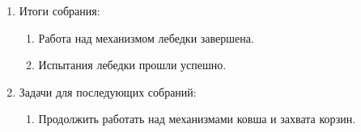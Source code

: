\begin{enumerate}
\begin{enumerate}
    \end{enumerate}
    
	\item Итоги собрания: 
	\begin{enumerate}
	  \item	Работа над механизмом лебедки завершена.
	  
	  \item	Испытания лебедки прошли успешно.
	  
    \end{enumerate}
    
	\item Задачи для последующих собраний:
	\begin{enumerate}
	  \item	Продолжить работать над механизмами ковша и захвата корзин.
	  
    \end{enumerate}     
\end{enumerate}
\fillpage

